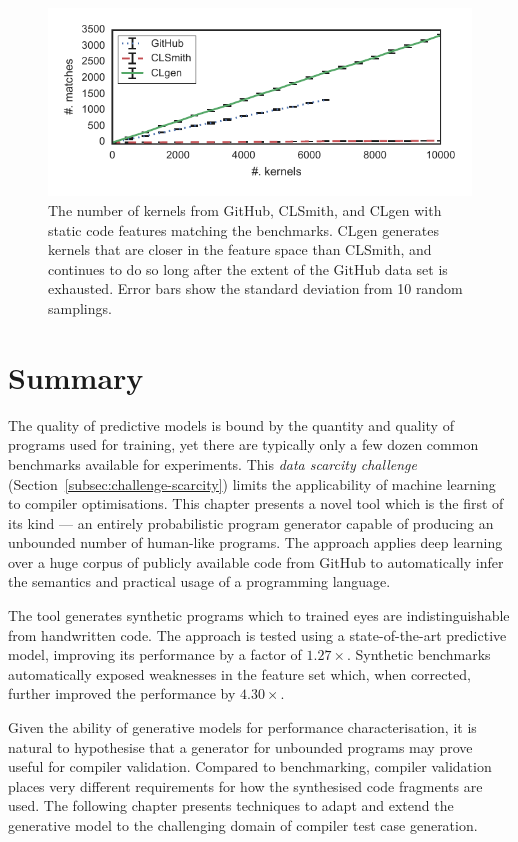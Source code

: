 \begin{figure}
  \includegraphics[width=\columnwidth]{img/closeness} %
  \caption[Number of kernels matching benchmark features]{%
    The number of kernels from GitHub, CLSmith, and CLgen with static code features matching the benchmarks. CLgen generates kernels that are closer in the feature space than CLSmith, and continues to do so long after the extent of the GitHub data set is exhausted. Error bars show the standard deviation from 10 random samplings.%
  }%
  \label{fig:clgen-nearest-neighbour}
\end{figure}


\section{Summary}
\label{sec:clgen-conclusion}

The quality of predictive models is bound by the quantity and quality of programs used for training, yet there are typically only a few dozen common benchmarks available for experiments. This \emph{data scarcity challenge} (Section~\ref{subsec:challenge-scarcity}) limits the applicability of machine learning to compiler optimisations. This chapter presents a novel tool which is the first of its kind --- an entirely probabilistic program generator capable of producing an unbounded number of human-like programs. The approach applies deep learning over a huge corpus of publicly available code from GitHub to automatically infer the semantics and practical usage of a programming language.

The tool generates synthetic programs which to trained eyes are indistinguishable from handwritten code. The approach is tested using a state-of-the-art predictive model, improving its performance by a factor of $1.27\times$. Synthetic benchmarks automatically exposed weaknesses in the feature set which, when corrected, further improved the performance by $4.30\times$.

Given the ability of generative models for performance characterisation, it is natural to hypothesise that a generator for unbounded programs may prove useful for compiler validation. Compared to benchmarking, compiler validation places very different requirements for how the synthesised code fragments are used. The following chapter presents techniques to adapt and extend the generative model to the challenging domain of compiler test case generation.
